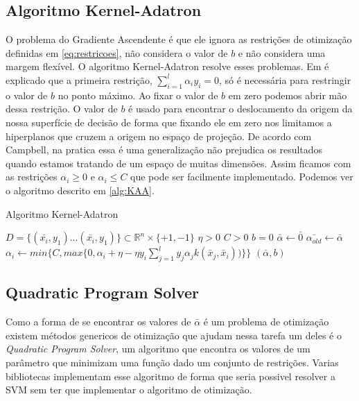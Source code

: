 \subsection{Algoritmo Kernel-Adatron} \label{sec:kaa}
O problema do Gradiente Ascendente é que ele ignora as restrições de otimização definidas em \ref{eq:restricoes}, não considera o valor de $b$ e não considera uma margem flexível. O algoritmo Kernel-Adatron resolve esses problemas. Em \cite{art:LIVRO_KAA} é explicado que a primeira restrição, $\sum_{i=1}^{l}\alpha_i y_i = 0$, só é necessária para restringir o valor de $b$ no ponto máximo. Ao fixar o valor de $b$ em zero podemos abrir mão dessa restrição. O valor de $b$ é usado para encontrar o deslocamento da origem da nossa superfície de decisão de forma que fixando ele em zero nos limitamos a hiperplanos que cruzem a origem no espaço de projeção. De acordo com Campbell, na pratica essa é uma generalização não prejudica os resultados quando estamos tratando de um espaço de muitas dimensões. Assim ficamos com as restrições $\alpha_i \ge 0$ e $\alpha_i \le C$ que pode ser facilmente implementado. Podemos ver o algoritmo descrito em \ref{alg:KAA}.

\begin{algorithm}
\label{alg:KAA}
\caption{Algoritmo Kernel-Adatron}
\begin{algorithmic}
\STATE $D = \{(\bar{x_i},y_1)...(\bar{x_i},y_1)\} \subset \mathbb{R}^{n}\times \{+1,-1\}$
\STATE $\eta>0$
\STATE $C>0$
\STATE $b=0$
\STATE $\bar{\alpha} \leftarrow \bar{0}$
\REPEAT
\STATE $\bar{\alpha_{old}} \leftarrow \bar{\alpha}$
\STATE $\alpha_i \leftarrow min\big\{C,max\big\{0,\alpha_i + \eta-\eta y_i \sum_{j=1}^l y_j \alpha_j k(\bar{x}_j,\bar{x}_i))\big\}\big\}$
\ENDFOR
{}
\RETURN $(\bar{\alpha},b)$
\end{algorithmic}
\end{algorithm}

\subsection{Quadratic Program Solver}
Como a forma de se encontrar os valores de $\bar{\alpha}$ é um problema de otimização existem métodos genericos de otimização que ajudam nessa tarefa um deles é o \emph{Quadratic Program Solver}, um algoritmo que encontra os valores de um parâmetro que minimizam uma função dado um conjunto de restrições. Varias bibliotecas implementam esse algoritmo de forma que seria possivel resolver a SVM sem ter que implementar o algoritmo de otimização.
